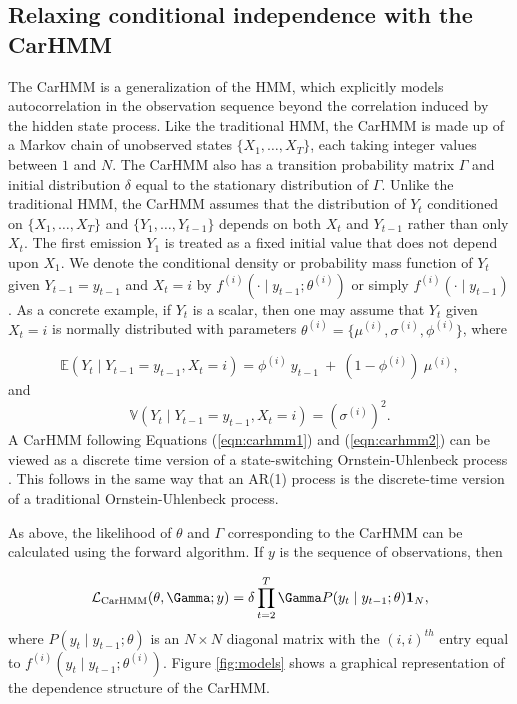 \subsection{Relaxing conditional independence with the CarHMM}
\label{subsec:CarHMM}

The CarHMM \citep{Lawler:2019} is a generalization of the HMM, which explicitly models autocorrelation in the observation sequence beyond the correlation induced by the hidden state process. Like the traditional HMM, the CarHMM is made up of a Markov chain of unobserved states $\{X_1,\ldots,X_T\}$, each taking integer values between $1$ and $N$. The CarHMM also has a transition probability matrix $\Gamma$ and initial distribution $\delta$ equal to the stationary distribution of $\Gamma$. Unlike the traditional HMM, the CarHMM assumes that the distribution of $Y_t$ conditioned on $\{X_1,\ldots, X_T\}$ and $\{Y_1,\ldots, Y_{t-1}\}$ depends on both $X_t$ and $Y_{t-1}$ rather than only $X_t$. The first emission $Y_1$ is treated as a fixed initial value that does not depend upon $X_1$. We denote the conditional density or probability mass function of $Y_t$ given $Y_{t-1} = y_{t-1}$ and $X_t=i$ by $f^{(i)}(\cdot \mid y_{t-1}; \theta^{(i)})$ or simply $f^{(i)}(\cdot \mid y_{t-1})$. 
%
As a concrete example, if $Y_t$ is a scalar, then one may assume that $Y_t$ given $X_t = i$ is normally distributed with parameters $\theta^{(i)} = \{\mu^{(i)},\sigma^{(i)},\phi^{(i)}\}$, where

\begin{equation}
    \mathbb{E}(Y_{t} \mid Y_{t-1} = y_{t-1},X_t=i) = \phi^{(i)} ~ y_{t-1} ~+ ~(1-\phi^{(i)})  ~\mu^{(i)},
    \label{eqn:carhmm1}
\end{equation}
and
\begin{equation}
    \mathbb{V}(Y_t \mid Y_{t-1} = y_{t-1},X_t=i) = (\sigma^{(i)})^2.
    \label{eqn:carhmm2}
\end{equation}
%
A CarHMM following Equations (\ref{eqn:carhmm1}) and (\ref{eqn:carhmm2}) can be viewed as a discrete time version of a state-switching Ornstein-Uhlenbeck process \citep{Michelot:2019}. This follows in the same way that an AR(1) process is the discrete-time version of a traditional Ornstein-Uhlenbeck process. 

As above, the likelihood of $\theta$ and $\Gamma$ corresponding to the CarHMM can be calculated using the forward algorithm. If $y$ is the sequence of observations, then

\begin{equation*}
    \calL_{\text{CarHMM}}(\theta,\Gamma;y) = \delta \prod_{t=2}^T \Gamma P(y_t \mid y_{t-1};\theta) \mathbf{1}_N,
    \label{eqn:CarHMM_likelihood}
\end{equation*}
where
%
$P(y_t \mid y_{t-1};\theta)$ is an $N \times N$ diagonal matrix with the $(i,i)^{th}$ entry equal to $f^{(i)}(y_t \mid y_{t-1}; \theta^{(i)})$. Figure \ref{fig:models} shows a graphical representation of the dependence structure of the CarHMM. 

